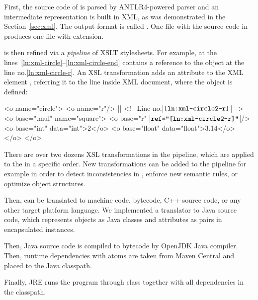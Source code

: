 First, the source code of \eo{} is parsed by ANTLR4-powered
parser and an intermediate representation is built in XML,
as was demonstrated in the Section~\ref{sec:xml}.
The output format is called \XMIR{}.
One  file with
the source code in \eo{} produces one \XMIR{} file with  extension.

\XMIR{} is then refined via a \emph{pipeline} of XSLT stylesheets.
For example, \XMIR{} at the
lines~\ref{ln:xml-circle}--\ref{ln:xml-circle-end} contains a
reference to the object  at the line no.\ref{ln:xml-circle-r}.
An XSL transformation adds an attribute  to the XML element ,
referring it to the line inside XML document, where the object  is defined:

\begin{ffcode}
<o name="circle">
  <o name="r"/> |$\label{ln:xml-circle2-r}$| <!-- Line no.|$\texttt{\ref{ln:xml-circle2-r}}$| -->
  <o base=".mul" name="square">
    <o base="r" |$\textbf{\texttt{ref="\ref{ln:xml-circle2-r}"}}$|/>
    <o base="int" data="int">2</o>
    <o base="float" data="float">3.14</o>
  </o>
</o>
\end{ffcode}

There are over two dozens XSL transformations in the pipeline, which
are applied to the \XMIR{} in a specific order. New transformations can
be added to the pipeline for example in order to detect inconsistencies
in \XMIR{}, enforce new semantic rules, or optimize object structures.

Then, \XMIR{} can be translated to machine code, bytecode, C++ source code,
or any other target platform language. We implemented
a translator to Java source code, which represents
\XMIR{} objects as Java classes and attributes as pairs in encapsulated
 instances.

Then, Java source code is compiled to bytecode by OpenJDK Java compiler.
Then, runtime dependencies with atoms are taken from Maven Central
and placed to the Java classpath.

Finally, JRE runs the program through  class together with
all  dependencies in the classpath.

